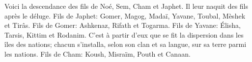 Voici la descendance des fils de Noé, Sem, Cham et Japhet.
	Il leur naquit des fils après le déluge.
Fils de Japhet: Gomer, Magog, Madaï, Yavane, Toubal, Mèshek et Tirâs.
Fils de Gomer: Ashkenaz, Rifath et Togarma.
Fils de Yavane: Élisha, Tarsis, Kittim et Rodanim.
C’est à partir d’eux que se fit la dispersion dans les îles des nations;
	chacun s’installa, selon son clan et sa langue,
	sur sa terre parmi les nations.
Fils de Cham: Koush, Misraïm, Pouth et Canaan.
